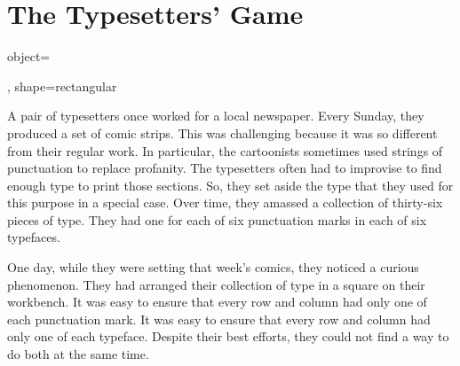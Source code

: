\documentclass[a4paper, DIV=15]{scrartcl}
\newlength{\wlen}
\newlength{\llen}
\begin{document}
\section*{The Typesetters' Game}
\begin{pullquote}
{object={
},
shape=rectangular}
A pair of typesetters once worked for a local newspaper. Every Sunday, they produced a set of comic strips. This was challenging because it was so different from their regular work. In particular, the cartoonists sometimes used strings of punctuation to replace profanity. The typesetters often had to improvise to find enough type to print those sections. So, they set aside the type that they used for this purpose in a special case. Over time, they amassed a collection of thirty-six pieces of type. They had one for each of six punctuation marks in each of six typefaces.

One day, while they were setting that week's comics, they noticed a curious phenomenon. They had arranged their collection of type in a square on their workbench. It was easy to ensure that every row and column had only one of each punctuation mark. It was easy to ensure that every row and column had only one of each typeface. Despite their best efforts, they could not find a way to do both at the same time.


\end{pullquote}
\end{document}
